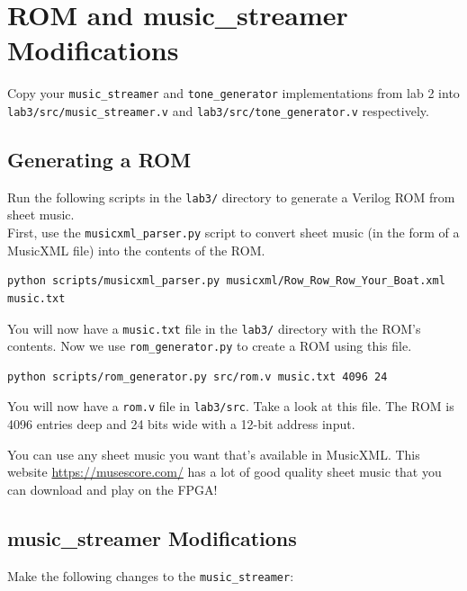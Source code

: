 \documentclass[11pt]{article}
\begin{document}
\section{ROM and music\_streamer Modifications}
Copy your \verb|music_streamer| and \verb|tone_generator| implementations from lab 2 into \verb|lab3/src/music_streamer.v| and \verb|lab3/src/tone_generator.v| respectively. 

\subsection{Generating a ROM}
Run the following scripts in the \verb|lab3/| directory to generate a Verilog ROM from sheet music.\\

First, use the \verb|musicxml_parser.py| script to convert sheet music (in the form of a MusicXML file) into the contents of the ROM.

\begin{verbatim}
python scripts/musicxml_parser.py musicxml/Row_Row_Row_Your_Boat.xml music.txt
\end{verbatim}

You will now have a \verb|music.txt| file in the \verb|lab3/| directory with the ROM's contents. Now we use \verb|rom_generator.py| to create a ROM using this file.

\begin{verbatim}
python scripts/rom_generator.py src/rom.v music.txt 4096 24
\end{verbatim}

You will now have a \verb|rom.v| file in \verb|lab3/src|. Take a look at this file. The ROM is 4096 entries deep and 24 bits wide with a 12-bit address input. 

You can use any sheet music you want that's available in MusicXML. This website \url{https://musescore.com/} has a lot of good quality sheet music that you can download and play on the FPGA!

\subsection{music\_streamer Modifications}

Make the following changes to the \verb|music_streamer|:
\end{document}
